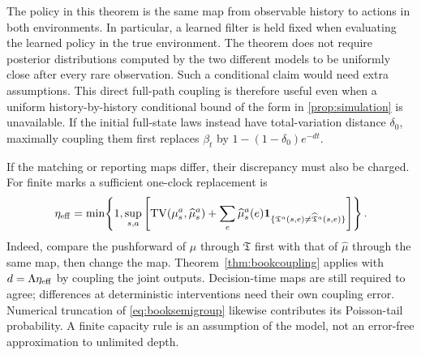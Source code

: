 \documentclass[11pt]{article}
\numberwithin{equation}{section}
\theoremstyle{definition}
\theoremstyle{remark}
\theoremstyle{definition}
\newcommand{\TV}{\operatorname{TV}}
\begin{document}
The policy in this theorem is the same map from observable history to
actions in both environments. In particular, a learned filter is held fixed
when evaluating the learned policy in the true environment. The theorem
does not require posterior distributions computed by the two different
models to be uniformly close after every rare observation. Such a
conditional claim would need extra assumptions. This direct full-path
coupling is therefore useful even when a uniform history-by-history
conditional bound of the form in \cref{prop:simulation} is unavailable.
If the initial full-state laws instead have total-variation distance
$\delta_0$, maximally coupling them first replaces $\beta_t$ by
$1-(1-\delta_0)e^{-dt}$.

If the matching or reporting maps differ, their discrepancy must also be
charged. For finite marks a sufficient one-clock replacement is
\begin{equation}\label{eq:clearingdisagreement}
 \eta_{\rm eff}=\min\!\left\{1,\sup_{s,a}\left[
 \TV(\mu_s^a,\widehat\mu_s^a)+
 \sum_e\widehat\mu_s^a(e)
       \mathbf1_{\{\mathfrak T^a(s,e)\ne\widehat{\mathfrak T}^a(s,e)\}}
                       \right]\right\}.
\end{equation}
Indeed, compare the pushforward of $\mu$ through $\mathfrak T$ first with
that of $\widehat\mu$ through the same map, then change the map.
Theorem~\ref{thm:bookcoupling} applies with $d=\Lambda\eta_{\rm eff}$
by coupling the joint outputs. Decision-time maps are still required to
agree; differences at deterministic interventions need their own coupling
error. Numerical truncation of \eqref{eq:booksemigroup} likewise contributes
its Poisson-tail probability. A finite capacity rule is an assumption of the
model, not an error-free approximation to unlimited depth.
\end{document}
